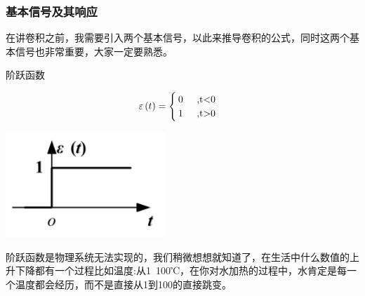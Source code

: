 \documentclass[UTF8,a4paper,12pt]{ctexart}
\begin{document}
     \subsubsection{基本信号及其响应}
     \begin{flushleft}
      在讲卷积之前，我需要引入两个基本信号，以此来推导卷积的公式，同时这两个基本信号也非常重要，大家一定要熟悉。
     \end{flushleft}
     \begin{titlebox}{阶跃函数}
   
   $$ \varepsilon \left( t \right)=
      \begin{cases}
       0 \text{\hspace{0.5cm},t<0}\\
       1 \text{\hspace{0.5cm},t>0}
      \end{cases}$$
      \begin{center}
        \par \includegraphics[width=6cm]{picture/step_signal.png}
      \end{center}
      阶跃函数是物理系统无法实现的，我们稍微想想就知道了，在生活中什么数值的上升下降都有一个过程比如温度:从1~100℃，在你对水加热的过程中，水肯定是每一个温度都会经历，而不是直接从1到100的直接跳变。
     \end{titlebox}
\end{document}
